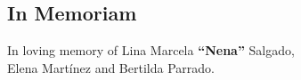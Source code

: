 \begin{flushright}
\section*{In Memoriam}
{\large In loving memory of Lina Marcela {\bf ``Nena''} Salgado,\\
Elena Martínez and Bertilda Parrado.}
\end{flushright}
